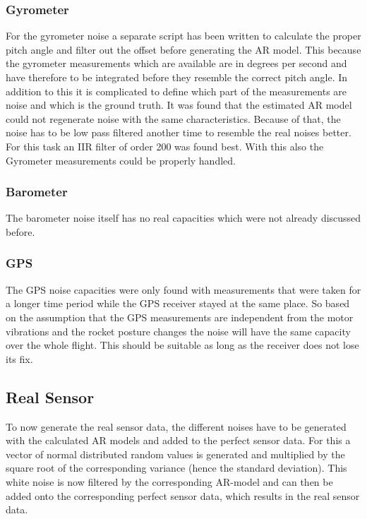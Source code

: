 \subsubsection{Gyrometer}
For the gyrometer noise a separate script has been written to calculate the proper pitch angle and filter out the offset before generating the AR model.
This because the gyrometer measurements which are available are in degrees per second
and have therefore to be integrated before they resemble the correct pitch angle.
In addition to this it is complicated to define which part of the measurements are noise and which is the ground truth.
It was found that the estimated AR model could not regenerate noise with the same characteristics.
Because of that, the noise has to be low pass filtered another time to resemble the real noises better.
For this task an IIR filter of order 200 was found best.
With this also the Gyrometer measurements could be properly handled.

\subsubsection{Barometer}
The barometer noise itself has no real capacities which were not already discussed before.

\subsubsection{GPS}
The GPS noise capacities were only found with measurements that were taken for a longer time period while the GPS receiver stayed at the same place.
So based on the assumption that the GPS measurements are independent from the motor vibrations and the rocket posture changes the noise will have the same capacity over the whole flight.
This should be suitable as long as the receiver does not lose its fix.

\newpage
\subsection{Real Sensor}
To now generate the real sensor data, the different noises have to be generated with the calculated AR models and added to the perfect sensor data.
For this a vector of normal distributed random values is generated and multiplied by the square root of the corresponding variance (hence the standard deviation).
This white noise is now filtered by the corresponding AR-model and can then be added onto the corresponding perfect sensor data, which results in the real sensor data.

